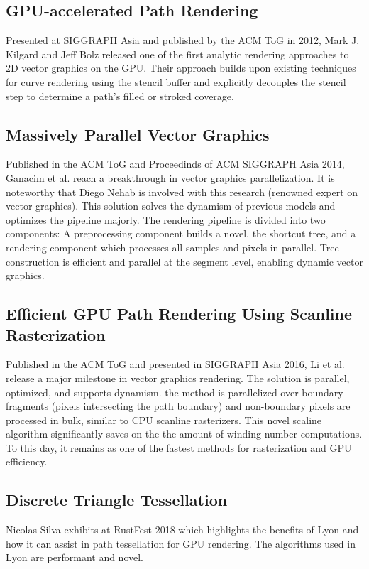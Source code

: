 \subsection{GPU-accelerated Path Rendering\cite{Kilgard12}}
Presented at SIGGRAPH Asia and published by the ACM ToG in 2012, Mark J. Kilgard and Jeff Bolz released one of the first analytic rendering approaches to 2D vector graphics on the GPU. Their approach builds upon existing techniques for curve rendering using the stencil buffer and explicitly decouples the stencil step to determine a path's filled or stroked coverage.\\

\subsection{Massively Parallel Vector Graphics\cite{Ganacim14}}
Published in the ACM ToG and Proceedinds of ACM SIGGRAPH Asia 2014, Ganacim et al. reach a breakthrough in vector graphics parallelization. It is noteworthy that Diego Nehab is involved with this research (renowned expert on vector graphics). This solution solves the dynamism of previous models and optimizes the pipeline majorly. The rendering pipeline is divided into two components: A preprocessing component builds a novel, the shortcut tree, and a rendering component which processes all samples and pixels in parallel. Tree construction is efficient and parallel at the segment level, enabling dynamic vector graphics.\\

\subsection{Efficient GPU Path Rendering Using Scanline Rasterization\cite{Li16}}
Published in the ACM ToG and presented in SIGGRAPH Asia 2016, Li et al. release a major milestone in vector graphics rendering. The solution is parallel, optimized, and supports dynamism. the method is parallelized over boundary fragments (pixels intersecting the path boundary) and non-boundary pixels are processed in bulk, similar to CPU scanline rasterizers. This novel scaline algorithm significantly saves on the the amount of winding number computations. To this day, it remains as one of the fastest methods for rasterization and GPU efficiency.

\subsection{Discrete Triangle Tessellation\cite{Silva18}}
Nicolas Silva exhibits at RustFest 2018 which highlights the benefits of Lyon and how it can assist in path tessellation for GPU rendering. The algorithms used in Lyon are performant and novel.

